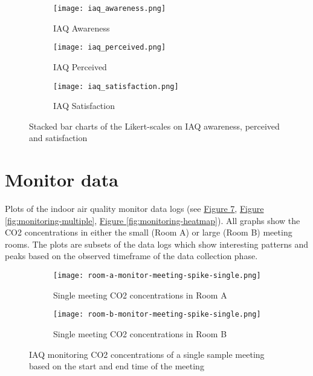 \begin{appendices}
\begin{figure}[htbp]
    \centering
    \begin{subfigure}{0.18\textwidth}
        \centering
        \texttt{[image: iaq\_awareness.png]}
        \caption{IAQ Awareness}
        \label{fig:survey-awareness}
    \end{subfigure}
    \hfill
    \begin{subfigure}{0.18\textwidth}
        \centering
        \texttt{[image: iaq\_perceived.png]}
        \caption{IAQ Perceived}
        \label{fig:survey-perceived}
    \end{subfigure}
    \hfill
    \begin{subfigure}{0.18\textwidth}
        \centering
        \texttt{[image: iaq\_satisfaction.png]}
        \caption{IAQ Satisfaction}
        \label{fig:survey-satisfaction}
    \end{subfigure}    
    \caption{Stacked bar charts of the Likert-scales on IAQ awareness, perceived and satisfaction}
    \label{fig:survey-stacked-bars}
\end{figure}

\newpage

\section{Monitor data}
\label{appendix:monitor-data}

Plots of the indoor air quality monitor data logs (see \hyperref[fig:monitoring-single]{Figure \ref{fig:monitoring-single}}, \hyperref[fig:monitoring-multiple]{Figure \ref{fig:monitoring-multiple}}, \hyperref[fig:monitoring-heatmap]{Figure \ref{fig:monitoring-heatmap}}). All graphs show the CO2 concentrations in either the small (Room A) or large (Room B) meeting rooms. The plots are subsets of the data logs which show interesting patterns and peaks based on the observed timeframe of the data collection phase.

\begin{figure}[htbp]
    \centering
    \begin{subfigure}{0.46\textwidth}
        \centering
        \texttt{[image: room-a-monitor-meeting-spike-single.png]}
        \caption{Single meeting CO2 concentrations in Room A}
        \label{fig:monitor-single-a}
    \end{subfigure}
    \hfill
    \begin{subfigure}{0.46\textwidth}
        \centering
        \texttt{[image: room-b-monitor-meeting-spike-single.png]}
        \caption{Single meeting CO2 concentrations in Room B}
        \label{fig:monitor-single-b}
    \end{subfigure}
    \caption{IAQ monitoring CO2 concentrations of a single sample meeting based on the start and end time of the meeting}
    \label{fig:monitoring-single}
\end{figure}


\end{appendices}
